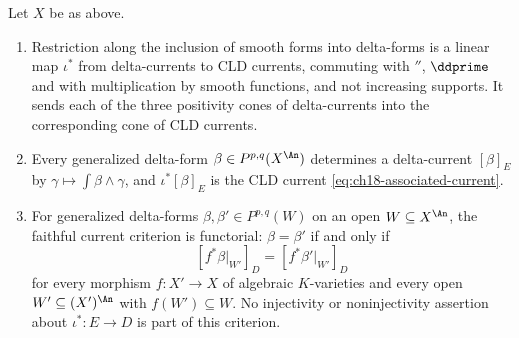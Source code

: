 \begin{proposition}
\label{prop:ch18-delta-vs-cld-currents}
Let $X$ be as above.
\begin{enumerate}
\item\label{itm:ch18-dc:restrict}
 Restriction along the inclusion of smooth forms into delta-forms is a
 linear map
 $\iota^\ast$ from delta-currents to CLD currents, commuting with
 $\dprime$, $\ddprime$ and with multiplication by smooth functions, and
 not increasing supports.  It sends each of the three positivity cones of
 delta-currents into the corresponding cone of CLD currents.
\item\label{itm:ch18-dc:form}
 Every generalized delta-form $\beta\in P^{p,q}(X^{\An})$ determines a
 delta-current $[\beta]_E$ by $\gamma\mapsto\int\beta\wedge\gamma$, and
 $\iota^\ast[\beta]_E$ is the CLD current
 \eqref{eq:ch18-associated-current}.
\item\label{itm:ch18-dc:criterion}
 For generalized delta-forms $\beta,\beta'\in P^{p,q}(W)$ on an open
 $W\subseteq X^{\An}$, the faithful current criterion is functorial:
 $\beta=\beta'$ if and only if
 \[
  [f^*\beta|_{W'}]_{D}=[f^*\beta'|_{W'}]_{D}
 \]
 for every morphism $f:X'\to X$ of algebraic $K$-varieties and every
 open $W'\subseteq(X')^{\An}$ with $f(W')\subseteq W$.  No injectivity or
 noninjectivity assertion about $\iota^*:E\to D$ is part of this criterion.
\end{enumerate}
\end{proposition}

